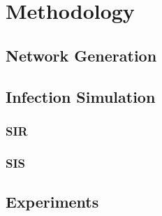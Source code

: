 \section{Methodology}
\subsection{Network Generation}
\subsection{Infection Simulation}
\subsubsection{SIR}
\subsubsection{SIS}
\subsection{Experiments}
\label{ssec:experiments}